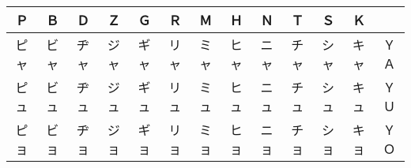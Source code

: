 \begin{center}
\begin{tabular}{|ccccc|ccccccc|c|}
\hline
Ｐ & Ｂ & Ｄ & Ｚ & Ｇ & Ｒ & Ｍ & Ｈ & Ｎ & Ｔ & Ｓ & Ｋ & 　 \\\hline
ピャ & ビャ & ヂャ & ジャ & ギャ & リャ & ミャ & ヒャ & ニャ & チャ & シャ & キャ & ＹＡ \\
ピュ & ビュ & ヂュ & ジュ & ギュ & リュ & ミュ & ヒュ & ニュ & チュ & シュ & キュ & ＹＵ \\
ピョ & ビョ & ヂョ & ジョ & ギョ & リョ & ミョ & ヒョ & ニョ & チョ & ショ & キョ & ＹＯ \\
\hline
\end{tabular}
\end{center}
